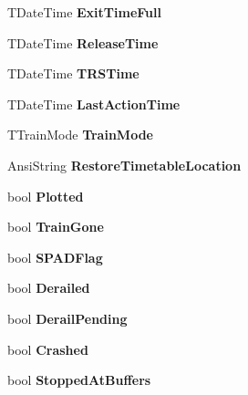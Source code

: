 \begin{DoxyCompactItemize}
T\+Date\+Time {\bfseries Exit\+Time\+Full}
\item 
\mbox{\label{class_t_train_a284962532ed0464d56031f46bae2354a}} 
T\+Date\+Time {\bfseries Release\+Time}
\item 
\mbox{\label{class_t_train_a7d04648c56b58359d476792c22800657}} 
T\+Date\+Time {\bfseries T\+R\+S\+Time}
\item 
\mbox{\label{class_t_train_a1887a95dd5762926ac67d244dd471e45}} 
T\+Date\+Time {\bfseries Last\+Action\+Time}
\item 
\mbox{\label{class_t_train_a860f87857baefc44a4928311698055a8}} 
T\+Train\+Mode {\bfseries Train\+Mode}
\item 
\mbox{\label{class_t_train_a2fe228470644e5b9bcc95b3e75f9bf36}} 
Ansi\+String {\bfseries Restore\+Timetable\+Location}
\item 
\mbox{\label{class_t_train_ae95ef74597b4ef92b9250699e25ef58a}} 
bool {\bfseries Plotted}
\item 
\mbox{\label{class_t_train_a3ecf54f0385bc6157ebe5f56512caf1f}} 
bool {\bfseries Train\+Gone}
\item 
\mbox{\label{class_t_train_a05383ce005a22df0cb70df7f31a917cf}} 
bool {\bfseries S\+P\+A\+D\+Flag}
\item 
\mbox{\label{class_t_train_aa7881a1af2b9f5e899ce02937325c3a3}} 
bool {\bfseries Derailed}
\item 
\mbox{\label{class_t_train_aabb977acb12c9cd6cd527faed9637830}} 
bool {\bfseries Derail\+Pending}
\item 
\mbox{\label{class_t_train_acee5980b53db6ad43e7b5225ad354457}} 
bool {\bfseries Crashed}
\item 
\mbox{\label{class_t_train_a9a549bcd3e8c0d24701399349bc3acc9}} 
bool {\bfseries Stopped\+At\+Buffers}
\item 
\mbox{\label{class_t_train_a444b07eb854c9af80adce5afbb207307}} 

\end{DoxyCompactItemize}
